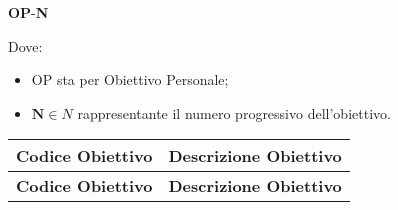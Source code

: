 \begin{center}
    \textbf{OP}-\textbf{N}
\end{center}

Dove:
\begin{itemize}
    \item OP sta per Obiettivo Personale; \\
    \item $\textbf{N} \in N$ rappresentante il numero progressivo dell'obiettivo.
\end{itemize}

\pagebreak
\renewcommand{\arraystretch}{1.5} %

\begin{longtable}{|c|>{\centering\arraybackslash}p{}|} %
    \hline
    \rowcolor{green!30} %
    \textbf{Codice Obiettivo} & \textbf{Descrizione Obiettivo} \\
    \hline
    \endfirsthead %
    
    \hline
    \rowcolor{green!30} %
    \textbf{Codice Obiettivo} & \textbf{Descrizione Obiettivo} \\
    \hline
    \endhead %
    

\end{longtable}
